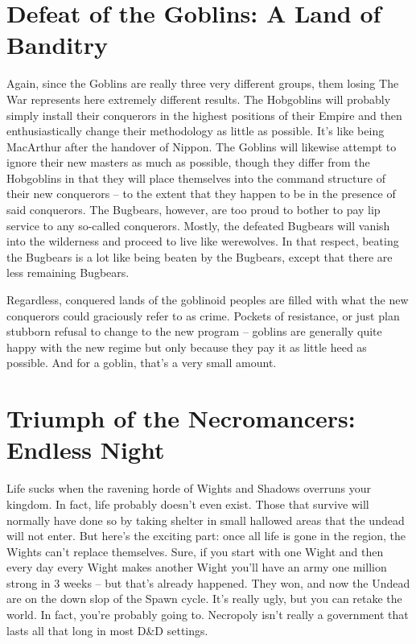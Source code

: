 \section{Defeat of the Goblins: A Land of Banditry}

Again, since the Goblins are really three very different groups, them losing The War represents here extremely different results. The Hobgoblins will probably simply install their conquerors in the highest positions of their Empire and then enthusiastically change their methodology as little as possible. It's like being MacArthur after the handover of Nippon. The Goblins will likewise attempt to ignore their new masters as much as possible, though they differ from the Hobgoblins in that they will place themselves into the command structure of their new conquerors -- to the extent that they happen to be in the presence of said conquerors. The Bugbears, however, are too proud to bother to pay lip service to any so-called conquerors. Mostly, the defeated Bugbears will vanish into the wilderness and proceed to live like werewolves. In that respect, beating the Bugbears is a lot like being beaten by the Bugbears, except that there are less remaining Bugbears.

Regardless, conquered lands of the goblinoid peoples are filled with what the new conquerors could graciously refer to as crime. Pockets of resistance, or just plan stubborn refusal to change to the new program -- goblins are generally quite happy with the new regime but only because they pay it as little heed as possible. And for a goblin, that's a very small amount.

\section{Triumph of the Necromancers: Endless Night}

Life sucks when the ravening horde of Wights and Shadows overruns your kingdom. In fact, life probably doesn't even exist. Those that survive will normally have done so by taking shelter in small hallowed areas that the undead will not enter. But here's the exciting part: once all life is gone in the region, the Wights can't replace themselves. Sure, if you start with one Wight and then every day every Wight makes another Wight you'll have an army one million strong in 3 weeks -- but that's already happened. They won, and now the Undead are on the down slop of the Spawn cycle. It's really ugly, but you can retake the world. In fact, you're probably going to. Necropoly isn't really a government that lasts all that long in most D\&D settings.

